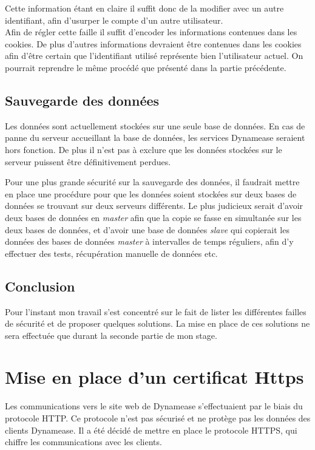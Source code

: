 Cette information étant en claire il suffit donc de la modifier avec un autre identifiant, afin d'usurper le compte d'un autre utilisateur.
\\

Afin de régler cette faille il suffit d'encoder les informations contenues dans les cookies. De plus d'autres informations devraient être contenues dans les cookies afin d'être certain que l'identifiant utilisé représente bien l'utilisateur actuel. On pourrait reprendre le même procédé que présenté dans la partie précédente.

\subsection{Sauvegarde des données}

Les données sont actuellement stockées sur une seule base de données. En cas de panne du serveur accueillant la base de données, les services Dynamease seraient hors fonction. De plus il n'est pas à exclure que les données stockées sur le serveur puissent être définitivement perdues.

Pour une plus grande sécurité sur la sauvegarde des données, il faudrait mettre en place une procédure pour que les données soient stockées sur deux bases de données se trouvant sur deux serveurs différents. Le plus judicieux serait d'avoir deux bases de données en \textit{master} afin que la copie se fasse en simultanée sur les deux bases de données, et d'avoir une base de données \textit{slave} qui copierait les données des bases de données \textit{master} à intervalles de temps réguliers, afin d'y effectuer des tests, récupération manuelle de données etc.

\subsection{Conclusion}

Pour l'instant mon travail s'est concentré sur le fait de lister les différentes failles de sécurité et de proposer quelques solutions. La mise en place de ces solutions ne sera effectuée que durant la seconde partie de mon stage.

\section{Mise en place d'un certificat Https}

Les communications vers le site web de Dynamease s'effectuaient par le biais du protocole HTTP. Ce protocole n'est pas sécurisé et ne protège pas les données des clients Dynamease. Il a été décidé de mettre en place le protocole HTTPS, qui chiffre les communications avec les clients.

